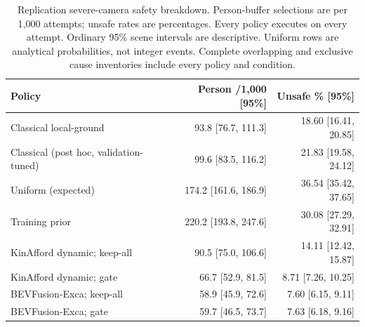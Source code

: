 \begin{table}[H]\centering\scriptsize\setlength{\tabcolsep}{3pt}
\caption{Replication severe-camera safety breakdown. Person-buffer selections are per 1,000 attempts; unsafe rates are percentages. Every policy executes on every attempt. Ordinary 95\% scene intervals are descriptive. Uniform rows are analytical probabilities, not integer events. Complete overlapping and exclusive cause inventories include every policy and condition.}\label{tab:personsafety}
\begin{tabular}{lrr}\toprule Policy & Person /1,000 [95\%] & Unsafe \% [95\%]\\\midrule
Classical local-ground & 93.8 [76.7, 111.3] & 18.60 [16.41, 20.85]\\
Classical (post hoc, validation-tuned) & 99.6 [83.5, 116.2] & 21.83 [19.58, 24.12]\\
Uniform (expected) & 174.2 [161.6, 186.9] & 36.54 [35.42, 37.65]\\
Training prior & 220.2 [193.8, 247.6] & 30.08 [27.29, 32.91]\\
KinAfford dynamic; keep-all & 90.5 [75.0, 106.6] & 14.11 [12.42, 15.87]\\
KinAfford dynamic; gate & 66.7 [52.9, 81.5] & 8.71 [7.26, 10.25]\\
BEVFusion-Exca; keep-all & 58.9 [45.9, 72.6] & 7.60 [6.15, 9.11]\\
BEVFusion-Exca; gate & 59.7 [46.5, 73.7] & 7.63 [6.18, 9.16]\\
\bottomrule\end{tabular}\end{table}
